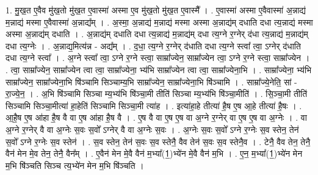 \documentclass[17pt]{extarticle}
\begin{document}
1. मु॒ख॒त ए॒वैव मु॑ख॒तो मु॑ख॒त ए॒वास्मा॑ अस्मा ए॒व मु॑ख॒तो मु॑ख॒त ए॒वास्मै᳚ । . ए॒वास्मा॑ अस्मा ए॒वैवास्मा॑ अ॒न्नाद्य॑ म॒न्नाद्य॑ मस्मा ए॒वैवास्मा॑ अ॒न्नाद्य᳚म् । . अ॒स्मा॒ अ॒न्नाद्य॑ म॒न्नाद्य॑ मस्मा अस्मा अ॒न्नाद्य॑म् दधाति दधा त्य॒न्नाद्य॑ मस्मा अस्मा अ॒न्नाद्य॑म् दधाति । . अ॒न्नाद्य॑म् दधाति दधा त्य॒न्नाद्य॑ म॒न्नाद्य॑म् दधा त्य॒ग्ने र॒ग्नेर् द॑धा त्य॒न्नाद्य॑ म॒न्नाद्य॑म् दधा त्य॒ग्नेः । . अ॒न्नाद्य॒मित्य॑न्न - अद्य᳚म् । . द॒धा॒ त्य॒ग्ने र॒ग्नेर् द॑धाति दधा त्य॒ग्ने स्त्वा᳚ त्वा॒ ऽग्नेर् द॑धाति दधा त्य॒ग्ने स्त्वा᳚ । . अ॒ग्ने स्त्वा᳚ त्वा॒ ऽग्ने र॒ग्ने स्त्वा॒ साम्रा᳚ज्येन॒ साम्रा᳚ज्येन त्वा॒ ऽग्ने र॒ग्ने स्त्वा॒ साम्रा᳚ज्येन । . त्वा॒ साम्रा᳚ज्येन॒ साम्रा᳚ज्येन त्वा त्वा॒ साम्रा᳚ज्येना॒ भ्य॑भि साम्रा᳚ज्येन त्वा त्वा॒ साम्रा᳚ज्येना॒भि । . साम्रा᳚ज्येना॒ भ्य॑भि साम्रा᳚ज्येन॒ साम्रा᳚ज्येना॒भि षि॑ञ्चामि सिञ्चाम्य॒भि साम्रा᳚ज्येन॒ साम्रा᳚ज्येना॒भि षि॑ञ्चामि । . साम्रा᳚ज्ये॒नेति॒ सां - रा॒ज्ये॒न॒ । . अ॒भि षि॑ञ्चामि सिञ्चा म्य॒भ्य॑भि षि॑ञ्चा॒मी तीति॑ सिञ्चा म्य॒भ्य॑भि षि॑ञ्चा॒मीति॑ । . सि॒ञ्चा॒मी तीति॑ सिञ्चामि सिञ्चा॒मीत्या॑ हा॒हेति॑ सिञ्चामि सिञ्चा॒मी त्या॑ह । . इत्या॑हा॒हे तीत्या॑ है॒ष ए॒ष आ॒हे तीत्या॑ है॒षः । . आ॒है॒ष ए॒ष आ॑हा है॒ष वै वा ए॒ष आ॑हा है॒ष वै । . ए॒ष वै वा ए॒ष ए॒ष वा अ॒ग्ने र॒ग्नेर् वा ए॒ष ए॒ष वा अ॒ग्नेः । . वा अ॒ग्ने र॒ग्नेर् वै वा अ॒ग्नेः स॒वः स॒वो᳚ ऽग्नेर् वै वा अ॒ग्नेः स॒वः । . अ॒ग्नेः स॒वः स॒वो᳚ ऽग्ने र॒ग्नेः स॒व स्तेन॒ तेन॑ स॒वो᳚ ऽग्ने र॒ग्नेः स॒व स्तेन॑ । . स॒व स्तेन॒ तेन॑ स॒वः स॒व स्तेनै॒ वैव तेन॑ स॒वः स॒व स्तेनै॒व । . टेनै॒ वैव तेन॒ तेनै॒ वैन॑ मेन मे॒व तेन॒ तेनै॒ वैन᳚म् । . ए॒वैन॑ मेन मे॒वै वैन॑ म॒भ्या᳚(1॒)भ्ये॑न मे॒वै वैन॑ म॒भि । . ए॒न॒ म॒भ्या᳚(1॒)भ्ये॑न मेन म॒भि षि॑ञ्चति सिञ्च त्य॒भ्ये॑न मेन म॒भि षि॑ञ्चति । \newline
\end{document}
